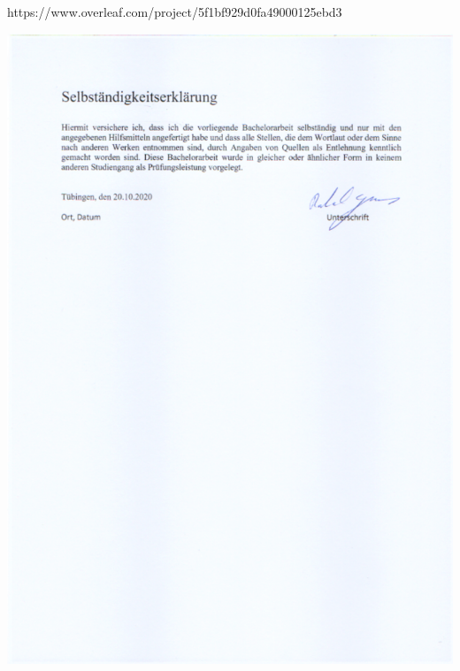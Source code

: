 \documentclass[twoside,12pt,a4paper]{report}
\begin{document}
\tableofcontents

\renewcommand{\baselinestretch}{1}
\small\normalsize

\newpage
{}
\setcounter{page}{1}


\cleardoublepage

\cleardoublepage

\cleardoublepage



https://www.overleaf.com/project/5f1bf929d0fa49000125ebd3



\cleardoublepage

\hspace*{-4.5cm}\includegraphics[page = 1]{Images/SelbstständigkeitserklärungSigned.pdf}
\end{document}
